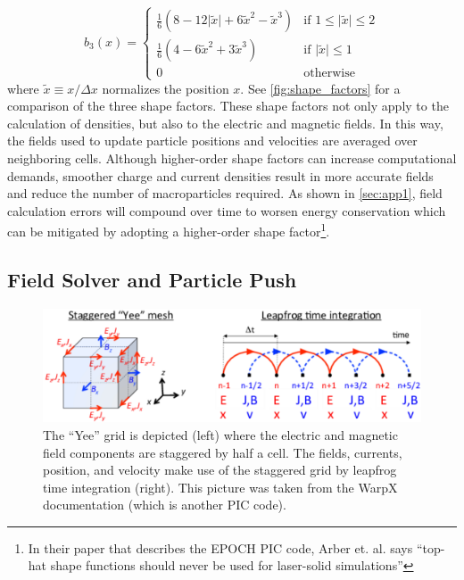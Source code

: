 \begin{equation}
	b_3(x) = \begin{cases}
		\frac{1}{6}(8 - 12 \lvert \tilde{x} \rvert + 6 \tilde{x}^2 - \tilde{x}^3) & \text{if } 1 \leq \lvert \tilde{x} \rvert \leq 2 \\
		\frac{1}{6}(4 - 6 \tilde{x}^2 + 3 \tilde{x}^3) & \text{if } \lvert \tilde{x} \rvert \leq 1 \\
		0 & \text{otherwise}
	\end{cases}
\end{equation}
where $\tilde{x} \equiv x / \Delta x$ normalizes the position $x$. See \autoref{fig:shape_factors} for a comparison of the three shape factors. These shape factors not only apply to the calculation of densities, but also to the electric and magnetic fields. In this way, the fields used to update particle positions and velocities are averaged over neighboring cells. Although higher-order shape factors can increase computational demands, smoother charge and current densities result in more accurate fields and reduce the number of macroparticles required. As shown in \autoref{sec:app1}, field calculation errors will compound over time to worsen energy conservation which can be mitigated by adopting a higher-order shape factor\footnote{In their paper that describes the EPOCH PIC code, Arber et. al. \cite{Arber_2015_PPCF} says ``top-hat shape functions should never be used for laser-solid simulations''}. 

\subsection{Field Solver and Particle Push}

\begin{figure}
	\centering 
	\includegraphics[width=0.8\linewidth]{planning/images/yee_grid.PNG}
	\caption{The ``Yee'' grid is depicted (left) where the electric and magnetic field components are staggered by half a cell. The fields, currents, position, and velocity make use of the staggered grid by leapfrog time integration (right). This picture was taken from the WarpX documentation \cite{WarpX_documentation} (which is another PIC code).}
	\label{fig:yee_grid}
\end{figure}

